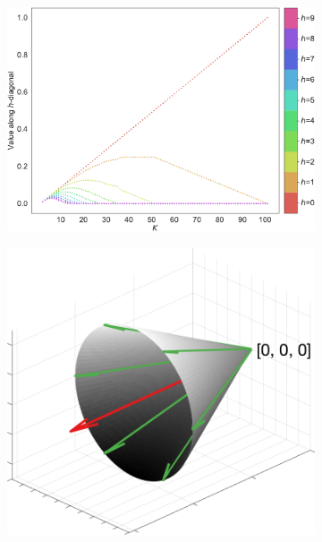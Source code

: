 \documentclass[twoside,11pt]{article}
\begin{document}
\begin{figure}[t]
{\begin{subfigure}{.26\linewidth}
		\caption{}
		\label{fig:ring_k-evolution_eigs}
	\end{subfigure}%
	\hfill
	\begin{subfigure}{.34\linewidth}
		\includegraphics[width=\linewidth]{circle/circle_k-evolution.pdf}
		\caption{}
		\label{fig:ring_k-evolution_diags}
	\end{subfigure}%
	\hfill
	\begin{subfigure}{.18\linewidth}
		\centering
		\includegraphics[width=\linewidth]{additional/cone_structure}
		\caption{}
		\label{fig:cone_structure}
	\end{subfigure}	
	\hfill
	}


\end{figure}
\end{document}
